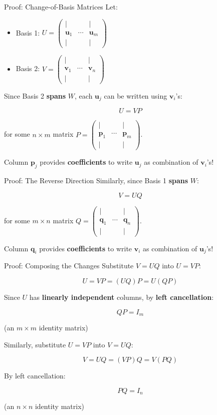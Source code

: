 \documentclass[10pt]{beamer}
\theoremstyle{definition}
\newcommand{\x}[1]{\alert{\textbf{#1}}}
\begin{document}
\begin{frame}{Proof: Change-of-Basis Matrices}
Let:
\begin{itemize}
\item Basis 1: $U = \begin{pmatrix} | & & | \\ \mathbf{u}_1 & \cdots & \mathbf{u}_m \\ | & & | \end{pmatrix}$
\item Basis 2: $V = \begin{pmatrix} | & & | \\ \mathbf{v}_1 & \cdots & \mathbf{v}_n \\ | & & | \end{pmatrix}$
\end{itemize}

\vfill
Since Basis 2 \x{spans} $W$, each $\mathbf{u}_j$ can be written using $\mathbf{v}_i$'s:

$$U = V P$$

for some $n \times m$ matrix $P = \begin{pmatrix} | & & | \\ \mathbf{p}_1 & \cdots & \mathbf{p}_m \\ | & & | \end{pmatrix}$.

\vfill
Column $\mathbf{p}_j$ provides \x{coefficients} to write $\mathbf{u}_j$ as combination of $\mathbf{v}_i$'s!
\end{frame}

\begin{frame}{Proof: The Reverse Direction}
Similarly, since Basis 1 \x{spans} $W$:

$$V = U Q$$

for some $m \times n$ matrix $Q = \begin{pmatrix} | & & | \\ \mathbf{q}_1 & \cdots & \mathbf{q}_n \\ | & & | \end{pmatrix}$.

\vfill
Column $\mathbf{q}_i$ provides \x{coefficients} to write $\mathbf{v}_i$ as combination of $\mathbf{u}_j$'s!
\end{frame}

\begin{frame}{Proof: Composing the Changes}
Substitute $V = UQ$ into $U = VP$:

$$U = VP = (UQ)P = U(QP)$$

\vfill
Since $U$ has \x{linearly independent} columns, by \x{left cancellation}:

$$QP = I_m$$

(an $m \times m$ identity matrix)

\vfill
Similarly, substitute $U = VP$ into $V = UQ$:

$$V = UQ = (VP)Q = V(PQ)$$

By left cancellation:

$$PQ = I_n$$

(an $n \times n$ identity matrix)
\end{frame}
\end{document}
